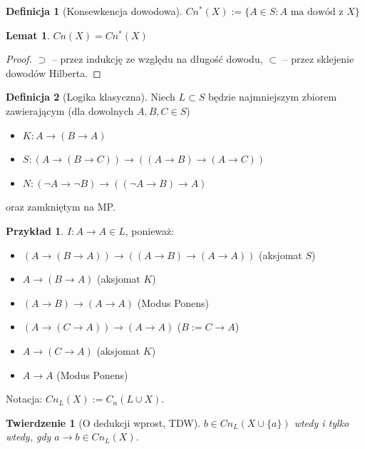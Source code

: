 \documentclass[10pt,a4paper]{article}
\theoremstyle{plain}
\newtheorem{theorem}{Twierdzenie}
\newtheorem{lemma}{Lemat}
\theoremstyle{definition}
\newtheorem*{definition}{Definicja}
\newtheorem*{example}{Przykład}
\newcommand{\impl}{\rightarrow}
\begin{document}

\begin{definition}[Konsewkencja dowodowa]
$Cn^*(X) := \{ A \in S: A \text{ ma dowód z } X\}$
\end{definition}

\begin{lemma}
$Cn(X) = Cn^*(X)$
\end{lemma}

\begin{proof}
$\supset$ -- przez indukcję ze względu na długość dowodu,
$\subset$ -- przez sklejenie dowodów Hilberta.
\end{proof}

\bigskip

\begin{definition}[Logika klasyczna]
Niech $L \subset S$ będzie najmniejszym zbiorem zawierającym (dla dowolnych
$A, B, C \in S$)
\begin{itemize}
  \item $K: A \impl (B \impl A)$
  \item $S: (A \impl (B \impl C)) \impl ((A \impl B) \impl (A \impl C))$
  \item $N: (\neg A \impl \neg B) \impl ((\neg A \impl B) \impl A)$
\end{itemize}
oraz zamkniętym na MP.
\end{definition}

\begin{example}
$I: A \impl A \in L$, ponieważ:
\begin{itemize}
  \item $(A \impl (B \impl A)) \impl ((A \impl B) \impl (A \impl A))$
    \quad(aksjomat $S$)
  \item $A \impl (B \impl A)$ \quad(aksjomat $K$)
  \item $(A \impl B) \impl (A \impl A)$ \quad(Modus Ponens)
  \item $(A \impl (C \impl A)) \impl (A \impl A)$ \quad($B := C \impl A$)
  \item $A \impl (C \impl A)$ \quad(aksjomat $K$)
  \item $A \impl A$ \quad(Modus Ponens)
\end{itemize}
\end{example}

\noindent Notacja: $Cn_L(X) := C_n(L \cup X)$.

\begin{theorem}[O dedukcji wprost, TDW]
$b \in Cn_L(X \cup \{a\})$ wtedy i tylko wtedy, gdy $a \impl b \in Cn_L(X)$.
\end{theorem}
\end{document}
